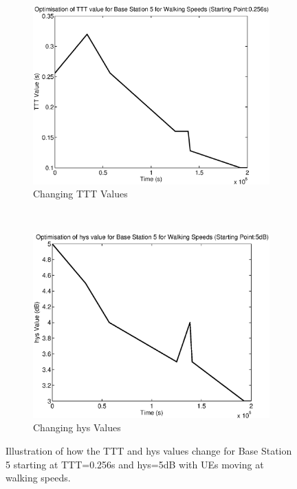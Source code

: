 \begin{figure}[H]
        \centering
        \begin{subfigure}[b]{0.49\textwidth}
                \includegraphics[width=\textwidth]{figures/graphs/walkmid/TTT5.eps}
                \caption{Changing TTT Values}
        \end{subfigure}%
        ~ %
        \begin{subfigure}[b]{0.49\textwidth}
                \includegraphics[width=\textwidth]{figures/graphs/walkmid/hys5.eps}
                \caption{Changing hys Values}
        \end{subfigure}
        \caption{Illustration of how the TTT and hys values change for Base Station 5 starting at TTT=0.256s and hys=5dB with UEs moving at walking speeds.}
\end{figure}
